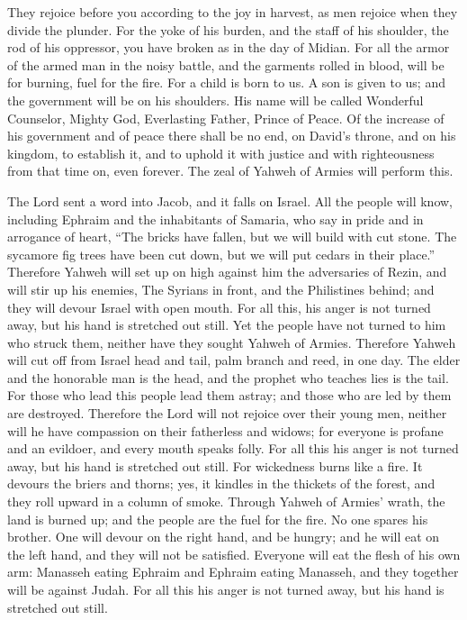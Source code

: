 They rejoice before you according to the joy in harvest, as men rejoice
when they divide the plunder.  For the yoke of his burden,
and the staff of his shoulder, the rod of his oppressor, you have broken
as in the day of Midian.  For all the armor of the armed man
in the noisy battle, and the garments rolled in blood, will be for
burning, fuel for the fire.  For a child is born to us. A
son is given to us; and the government will be on his shoulders. His
name will be called Wonderful Counselor, Mighty God, Everlasting Father,
Prince of Peace.  Of the increase of his government and of
peace there shall be no end, on David's throne, and on his kingdom, to
establish it, and to uphold it with justice and with righteousness from
that time on, even forever. The zeal of Yahweh of Armies will perform
this.

 The Lord sent a word into Jacob, and it falls on Israel.
 All the people will know, including Ephraim and the
inhabitants of Samaria, who say in pride and in arrogance of heart,
 ``The bricks have fallen, but we will build with cut
stone. The sycamore fig trees have been cut down, but we will put cedars
in their place.''  Therefore Yahweh will set up on high
against him the adversaries of Rezin, and will stir up his enemies,
 The Syrians in front, and the Philistines behind; and they
will devour Israel with open mouth. For all this, his anger is not
turned away, but his hand is stretched out still.  Yet the
people have not turned to him who struck them, neither have they sought
Yahweh of Armies.  Therefore Yahweh will cut off from
Israel head and tail, palm branch and reed, in one day. 
The elder and the honorable man is the head, and the prophet who teaches
lies is the tail.  For those who lead this people lead them
astray; and those who are led by them are destroyed. 
Therefore the Lord will not rejoice over their young men, neither will
he have compassion on their fatherless and widows; for everyone is
profane and an evildoer, and every mouth speaks folly. For all this his
anger is not turned away, but his hand is stretched out still.
 For wickedness burns like a fire. It devours the briers
and thorns; yes, it kindles in the thickets of the forest, and they roll
upward in a column of smoke.  Through Yahweh of Armies'
wrath, the land is burned up; and the people are the fuel for the fire.
No one spares his brother.  One will devour on the right
hand, and be hungry; and he will eat on the left hand, and they will not
be satisfied. Everyone will eat the flesh of his own arm: 
Manasseh eating Ephraim and Ephraim eating Manasseh, and they together
will be against Judah. For all this his anger is not turned away, but
his hand is stretched out still.

